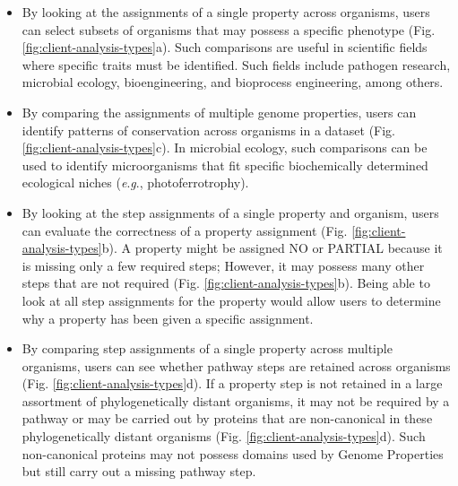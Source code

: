 \FloatBarrier
\begin{itemize}
\item By looking at the assignments of a single property across organisms, users 
can select subsets of organisms that may possess a specific phenotype (Fig. 
\ref{fig:client-analysis-types}a). Such comparisons are useful in scientific 
fields where specific traits must be identified. Such fields include pathogen 
research, microbial ecology, bioengineering, and bioprocess engineering, among 
others.
\item By comparing the assignments of multiple genome properties, users can 
identify patterns of conservation across organisms in a dataset (Fig. 
\ref{fig:client-analysis-types}c). In microbial ecology, such comparisons can be 
used to identify microorganisms that fit specific biochemically determined 
ecological niches (\textit{e}.\textit{g}., photoferrotrophy).
\item By looking at the step assignments of a single property and 
organism, users can evaluate the correctness of a property assignment (Fig. 
\ref{fig:client-analysis-types}b). A property might be assigned NO or PARTIAL 
because it is missing only a few required steps; However, it may possess many 
other steps that are not required (Fig. \ref{fig:client-analysis-types}b). Being 
able to look at all step assignments for the property would allow users to 
determine why a property has been given a specific assignment.
\item By comparing step assignments of a single property across multiple 
organisms, users can see whether pathway steps are retained across organisms 
(Fig. \ref{fig:client-analysis-types}d). If a property step is not retained in a 
large assortment of phylogenetically distant organisms, it may not be required 
by a pathway or may be carried out by proteins that are non-canonical in these 
phylogenetically distant organisms (Fig. \ref{fig:client-analysis-types}d). Such 
non-canonical proteins may not possess domains used by Genome Properties but 
still carry out a missing pathway step.
\end{itemize}

